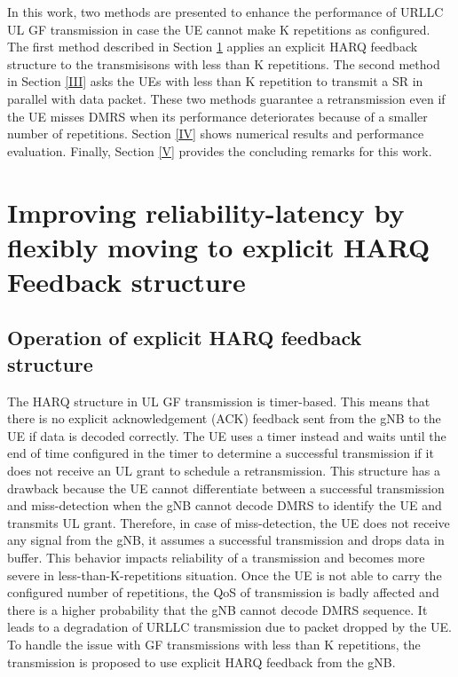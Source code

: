 \documentclass[conference]{IEEEtran}
\begin{document}
In this work, two methods are presented to enhance the performance of URLLC UL GF transmission in case the UE cannot make K repetitions as configured. The first method described in Section \ref{II} applies an explicit HARQ feedback structure to the transmisisons with less than K repetitions. The second method in Section \ref{III} asks the UEs with less than K repetition to transmit a SR in parallel with data packet. These two methods guarantee a retransmission even if the UE misses DMRS when its performance deteriorates because of a smaller number of repetitions. Section \ref{IV} shows numerical results and performance evaluation. Finally, Section \ref{V} provides the concluding remarks for this work.

\section{Improving reliability-latency by flexibly moving to explicit HARQ Feedback structure}\label{II}

\subsection{Operation of explicit HARQ feedback structure}\label{IIAA}

The HARQ structure in UL GF transmission is timer-based. This means that there is no explicit acknowledgement (ACK) feedback sent from the gNB to the UE if data is decoded correctly. The UE uses a timer instead and waits until the end of time configured in the timer to determine a successful transmission if it does not receive an UL grant to schedule a retransmission. This structure has a drawback because the UE cannot differentiate between a successful transmission and miss-detection when the gNB cannot decode DMRS to identify the UE and transmits UL grant. Therefore, in case of miss-detection, the UE does not receive any signal from the gNB, it assumes a successful transmission and drops data in buffer. This behavior impacts reliability of a transmission and becomes more severe in less-than-K-repetitions situation. Once the UE is not able to carry the configured number of repetitions, the QoS of transmission is badly affected and there is a higher probability that the gNB cannot decode DMRS sequence. It leads to a degradation of URLLC transmission due to packet dropped by the UE. To handle the issue with GF transmissions with less than K repetitions, the transmission is proposed to use explicit HARQ feedback from the gNB. 
\end{document}
